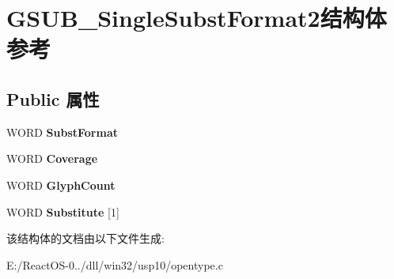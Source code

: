 \hypertarget{struct_g_s_u_b___single_subst_format2}{}\section{G\+S\+U\+B\+\_\+\+Single\+Subst\+Format2结构体 参考}
\label{struct_g_s_u_b___single_subst_format2}
\subsection*{Public 属性}
\begin{DoxyCompactItemize}
\item 
\mbox{\label{struct_g_s_u_b___single_subst_format2_ab9ba147c95c4f50f80f526c53b356aad}} 
W\+O\+RD {\bfseries Subst\+Format}
\item 
\mbox{\label{struct_g_s_u_b___single_subst_format2_a27d4daf359acf456fcf570423e37a045}} 
W\+O\+RD {\bfseries Coverage}
\item 
\mbox{\label{struct_g_s_u_b___single_subst_format2_a2de5e062242becfaa421cd3beadbdc86}} 
W\+O\+RD {\bfseries Glyph\+Count}
\item 
\mbox{\label{struct_g_s_u_b___single_subst_format2_adceb4c1b269a5929ac6f3cab14fb429d}} 
W\+O\+RD {\bfseries Substitute} \mbox{[}1\mbox{]}
\end{DoxyCompactItemize}


该结构体的文档由以下文件生成\+:\begin{DoxyCompactItemize}
\item 
E\+:/\+React\+O\+S-\/0../dll/win32/usp10/opentype.\+c\end{DoxyCompactItemize}
